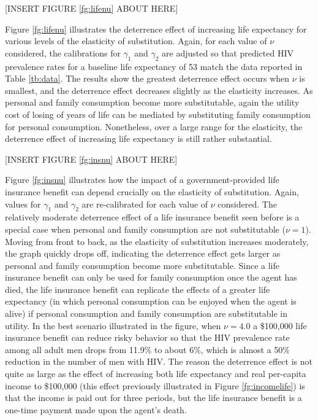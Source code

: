 \documentclass[12pt]{article}
\begin{document}
\begin{center}[INSERT FIGURE \ref{fg:lifenu} ABOUT HERE]\end{center}

Figure \ref{fg:lifenu} illustrates the deterrence effect of increasing life expectancy for various levels of the elasticity of substitution.  Again, for each value of $\nu$ considered, the calibrations for $\gamma_1$ and $\gamma_2$ are adjusted so that predicted HIV prevalence rates for a baseline life expectancy of 53 match the data reported in Table \ref{tb:data}.  The results show the greatest deterrence effect occurs when $\nu$ is smallest, and the deterrence effect decreases slightly as the elasticity increases.  As personal and family consumption become more substitutable, again the utility cost of losing of years of life can be mediated by substituting family consumption for personal consumption.  Nonetheless, over a large range for the elasticity, the deterrence effect of increasing life expectancy is still rather substantial.

\begin{center}[INSERT FIGURE \ref{fg:insnu} ABOUT HERE]\end{center}

Figure \ref{fg:insnu} illustrates how the impact of a government-provided life insurance benefit can depend crucially on the elasticity of substitution.  Again, values for $\gamma_1$ and $\gamma_2$ are re-calibrated for each value of $\nu$ considered.  The relatively moderate deterrence effect of a life insurance benefit seen before is a special case when personal and family consumption are not substitutable ($\nu=1$).  Moving from front to back, as the elasticity of substitution increases moderately, the graph quickly drops off, indicating the deterrence effect gets larger as personal and family consumption become more substitutable.  Since a life insurance benefit can only be used for family consumption once the agent has died, the life insurance benefit can replicate the effects of a greater life expectancy (in which personal consumption can be enjoyed when the agent is alive) if personal consumption and family consumption are substitutable in utility.  In the best scenario illustrated in the figure, when $\nu=4.0$ a \$100,000 life insurance benefit can reduce risky behavior so that the HIV prevalence rate among all adult men drops from 11.9\% to about 6\%, which is almost a 50\% reduction in the number of men with HIV.  The reason the deterrence effect is not quite as large as the effect of increasing both life expectancy and real per-capita income to \$100,000 (this effect previously illustrated in Figure \ref{fg:incomelife}) is that the income is paid out for three periods, but the life insurance benefit is a one-time payment made upon the agent's death.
\end{document}
